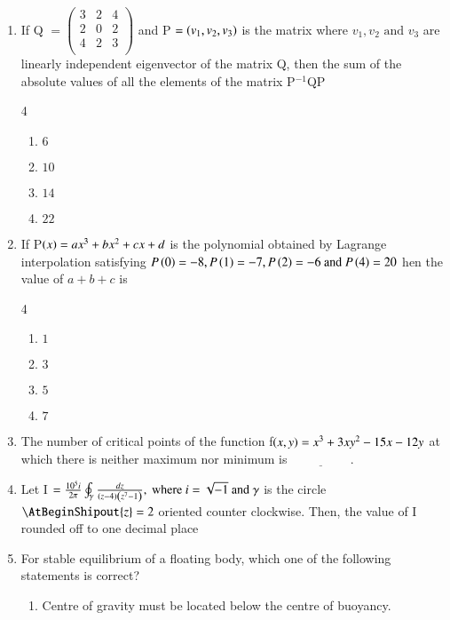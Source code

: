 \documentclass[journal]{IEEEtran}
\begin{document}
\begin{enumerate} [start=14]
\bigskip
\item If Q $= \begin{pmatrix}
3 & 2 & 4 \\
2 & 0 & 2 \\
4 & 2 & 3 \\
\end{pmatrix}$ and P $=\left(v_{1},v_{2},v_{3}\right)$ is the matrix where $v_{1},v_{2}\text{ and }v_{3}$ are linearly independent eigenvector of the matrix Q, then the sum of the absolute values of all the elements of the matrix P$^{-1}$QP
\begin{multicols} {4}
    \begin{enumerate}
        \item $6$
        \item $10$
        \item $14$
        \item $22$
    \end{enumerate}
\end{multicols}
\bigskip
\item If P$\left(x\right)=ax^{3}+bx^{2}+cx+d$ is the polynomial obtained by Lagrange interpolation satisfying $P\left(0\right)=-8,P\left(1\right)=-7,P\left(2\right)=-6\text{ and }P\left(4\right)=20$ hen the value of $a+b+c$ is 
\begin{multicols} {4}
    \begin{enumerate}
        \item $1$
        \item $3$
        \item $5$
        \item $7$
    \end{enumerate}
\end{multicols}
\bigskip
\item The number of critical points of the function f$\left(x,y\right)=x^{3}+3xy^{2}-15x-12y$ at which there is neither maximum nor minimum is $\underline{\hspace{2cm}}.$
\bigskip
\item Let I $=\frac{10^{5}i}{2\pi}\oint_{\gamma}\frac{dz}{\left(z-4\right)\left(z^{7}-1\right)},\text{ where } i = \sqrt{-1} \text{ and } \gamma$ is the circle $\AtBeginShipout{z}=2$ oriented counter clockwise. Then, the value of I rounded off to one decimal place
\bigskip
\item For stable equilibrium of a floating body, which one of the following statements is correct?
\begin{enumerate}
    \item Centre of gravity must be located below the centre of buoyancy.

\end{enumerate}
\end{enumerate}
\end{document}
